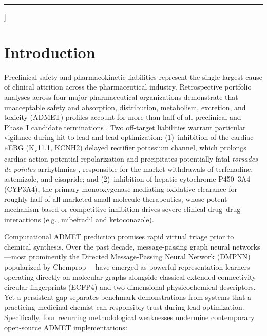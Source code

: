 \documentclass[10pt,twocolumn,letterpaper]{article}
\begin{document}
\begin{@twocolumnfalse}
  \vspace{0.25em}
  \vspace{0.55em}
  \noindent\textcolor{HairlineGray}{\rule{\linewidth}{0.6pt}}
  \vspace{0.9em}
\end{@twocolumnfalse}
]

\section{Introduction}
Preclinical safety and pharmacokinetic liabilities represent the single largest cause of clinical attrition across the pharmaceutical industry. Retrospective portfolio analyses across four major pharmaceutical organizations demonstrate that unacceptable safety and absorption, distribution, metabolism, excretion, and toxicity (\textsc{ADMET}) profiles account for more than half of all preclinical and Phase~I candidate terminations \citep{waring2015analysis}. Two off-target liabilities warrant particular vigilance during hit-to-lead and lead optimization: (1)~inhibition of the cardiac \textsc{hERG} (K\textsubscript{v}11.1, \textsc{KCNH2}) delayed rectifier potassium channel, which prolongs cardiac action potential repolarization and precipitates potentially fatal \textit{torsades de pointes} arrhythmias \citep{sanguinetti2006herg}, responsible for the market withdrawals of terfenadine, astemizole, and cisapride; and (2)~inhibition of hepatic cytochrome P450~3A4 (\textsc{CYP3A4}), the primary monooxygenase mediating oxidative clearance for roughly half of all marketed small-molecule therapeutics, whose potent mechanism-based or competitive inhibition drives severe clinical drug–drug interactions (e.g., mibefradil and ketoconazole).

Computational \textsc{ADMET} prediction promises rapid virtual triage prior to chemical synthesis. Over the past decade, message-passing graph neural networks—most prominently the Directed Message-Passing Neural Network (\textsc{DMPNN}) popularized by Chemprop \citep{yang2019analyzing}—have emerged as powerful representation learners operating directly on molecular graphs alongside classical extended-connectivity circular fingerprints (\textsc{ECFP4}) \citep{rogers2010extended} and two-dimensional physicochemical descriptors. Yet a persistent gap separates benchmark demonstrations from systems that a practicing medicinal chemist can responsibly trust during lead optimization. Specifically, four recurring methodological weaknesses undermine contemporary open-source \textsc{ADMET} implementations:
\end{document}
